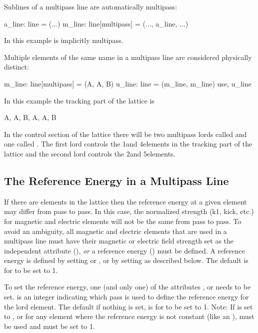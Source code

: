 Sublines of a multipass line are automatically multipass:
\begin{example}
  a_line: line = (...)
  m_line: line[multipass] = (..., a_line, ...)
\end{example}
In this example  is implicitly multipass.

Multiple elements of the same name in a multipass line are considered 
physically distinct:
\begin{example}
  m_line: line[multipass] = (A, A, B)
  u_line: line = (m_line, m_line)
  use, u_line
\end{example}
In this example the tracking part of the lattice is
\begin{example}
  A, A, B, A, A, B
\end{example}
In the control section of the lattice there will be two multipass
lords called  and one called . The first  lord 
controls the 1\St and 4\Th elements in the tracking part of the lattice 
and the second  lord controls the 2\Nd and 5\Th elements.

\subsection{The Reference Energy in a Multipass Line}
\label{s:ref.e.multi}

If there are  elements in the lattice then the reference
energy at a given element may differ from pass to pass. In this case,
the normalized strength (k1, kick, etc.) for magnetic and electric
elements will not be the same from pass to pass. To avoid an
ambiguity, all magnetic and electric elements that are used in a
multipass line must have their magnetic or electric field strength set
as the independent attribute (), {\em or} a reference
energy () must be defined. A reference energy is
defined by setting  or , or by setting
 as described below. The default is for 
to be set to 1.

To set the reference energy, one (and only one) of the attributes
,  or  needs to be
set.  is an integer indicating which pass is used to
define the reference energy for the lord element. The default if
nothing is set, is for  to be set to 1.  Note: If
 is set to , or for any element
where the reference energy is not constant (like an ),
 must be used and must be set to 1.

